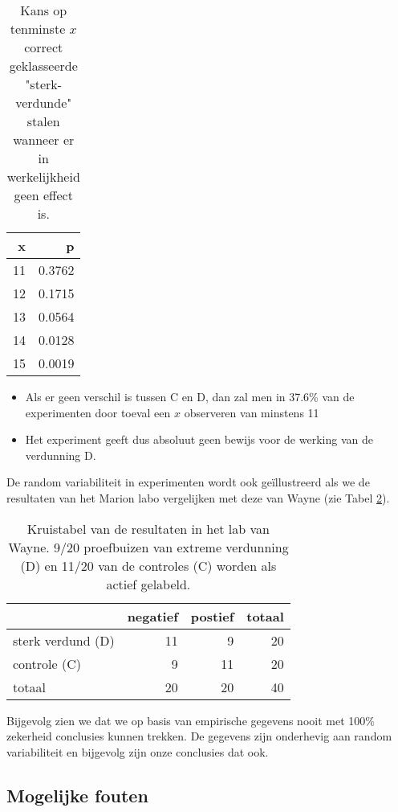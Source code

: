 \documentclass[12pt,dutch,coursenotes]{book}
\providecommand{\tightlist}{%
  \setlength{\itemsep}{0pt}\setlength{\parskip}{0pt}}
\theoremstyle{definition}
\theoremstyle{definition}
\theoremstyle{definition}
\theoremstyle{remark}
\begin{document}
\begin{table}[t]

\caption{\label{tab:pValTableH1}Kans op tenminste $x$ correct geklasseerde "sterk-verdunde" stalen wanneer er in werkelijkheid geen effect is.}
\centering
\begin{tabular}{rr}
\toprule
x & p\\
\midrule
11 & 0.3762\\
12 & 0.1715\\
13 & 0.0564\\
14 & 0.0128\\
15 & 0.0019\\
\bottomrule
\end{tabular}
\end{table}

\begin{itemize}
\tightlist
\item
  Als er geen verschil is tussen C en D, dan zal men in 37.6\% van de
  experimenten door toeval een \(x\) observeren van minstens 11
\item
  Het experiment geeft dus absoluut geen bewijs voor de werking van de
  verdunning D.
\end{itemize}

De random variabiliteit in experimenten wordt ook geïllustreerd als we
de resultaten van het Marion labo vergelijken met deze van Wayne (zie
Tabel \ref{tab:kruistabelWayne}).

\begin{table}[t]

\caption{\label{tab:kruistabelWayne}Kruistabel van de resultaten in het lab van Wayne. 9/20 proefbuizen van extreme verdunning (D) en 11/20 van de controles (C) worden als actief gelabeld.}
\centering
\begin{tabular}{lrrr}
\toprule
  & negatief & postief & totaal\\
\midrule
sterk verdund (D) & 11 & 9 & 20\\
controle (C) & 9 & 11 & 20\\
totaal & 20 & 20 & 40\\
\bottomrule
\end{tabular}
\end{table}

Bijgevolg zien we dat we op basis van empirische gegevens nooit met
100\% zekerheid conclusies kunnen trekken. De gegevens zijn onderhevig
aan random variabiliteit en bijgevolg zijn onze conclusies dat ook.

\subsection{Mogelijke fouten}\label{mogelijke-fouten}
\end{document}
